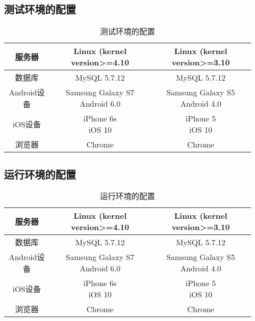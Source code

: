 \subsection{测试环境的配置}
\begin{table}[H]
\centering
\caption{测试环境的配置} \label{tab:test-environment}
\begin{tabular}{|c|c|c|}
    \hline
    服务器 & Linux (kernel version>=4.10 & Linux (kernel version>=3.10 \\
    \hline
    数据库 & MySQL 5.7.12 & MySQL 5.7.12 \\
    \hline
    Android设备 & \tabincell{c}{Samsung Galaxy S7\\Android 6.0} & \tabincell{c}{Samsung Galaxy S5\\Android 4.0} \\
    \hline
    iOS设备 & \tabincell{c}{iPhone 6s\\iOS 10} & \tabincell{c}{iPhone 5\\iOS 10}\\
    \hline
    浏览器 & Chrome & Chrome\\
    \hline
\end{tabular}
\end{table}

\subsection{运行环境的配置}
\begin{table}[H]
\centering
\caption{运行环境的配置} \label{tab:operation-environment}
\begin{tabular}{|c|c|c|}
    \hline
    服务器 & Linux (kernel version>=4.10 & Linux (kernel version>=3.10 \\
    \hline
    数据库 & MySQL 5.7.12 & MySQL 5.7.12 \\
    \hline
    Android设备 & \tabincell{c}{Samsung Galaxy S7\\Android 6.0} & \tabincell{c}{Samsung Galaxy S5\\Android 4.0} \\
    \hline
    iOS设备 & \tabincell{c}{iPhone 6s\\iOS 10} & \tabincell{c}{iPhone 5\\iOS 10}\\
    \hline
    浏览器 & Chrome & Chrome\\
    \hline
\end{tabular}
\end{table}

